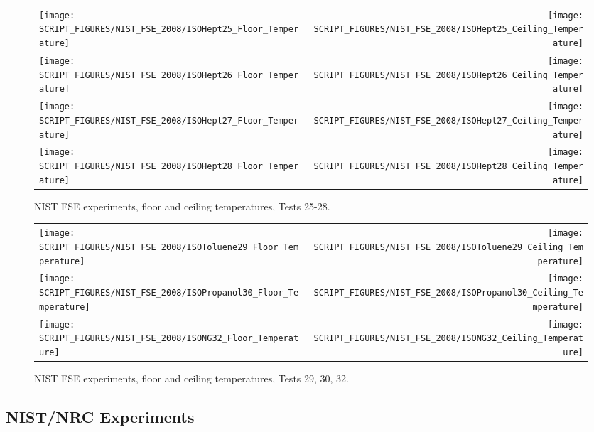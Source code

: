 \begin{figure}[p]
\begin{tabular*}{\textwidth}{l@{\extracolsep{\fill}}r}
\texttt{[image: SCRIPT\_FIGURES/NIST\_FSE\_2008/ISOHept25\_Floor\_Temperature]} &
\texttt{[image: SCRIPT\_FIGURES/NIST\_FSE\_2008/ISOHept25\_Ceiling\_Temperature]} \\
\texttt{[image: SCRIPT\_FIGURES/NIST\_FSE\_2008/ISOHept26\_Floor\_Temperature]} &
\texttt{[image: SCRIPT\_FIGURES/NIST\_FSE\_2008/ISOHept26\_Ceiling\_Temperature]} \\
\texttt{[image: SCRIPT\_FIGURES/NIST\_FSE\_2008/ISOHept27\_Floor\_Temperature]} &
\texttt{[image: SCRIPT\_FIGURES/NIST\_FSE\_2008/ISOHept27\_Ceiling\_Temperature]} \\
\texttt{[image: SCRIPT\_FIGURES/NIST\_FSE\_2008/ISOHept28\_Floor\_Temperature]} &
\texttt{[image: SCRIPT\_FIGURES/NIST\_FSE\_2008/ISOHept28\_Ceiling\_Temperature]}
\end{tabular*}
\caption[NIST FSE experiments, floor and ceiling temperatures, Tests 25-28]{NIST FSE experiments, floor and ceiling temperatures, Tests 25-28.}
\label{NIST_FSE_2008_Surface_Temp_6}
\end{figure}

\begin{figure}[p]
\begin{tabular*}{\textwidth}{l@{\extracolsep{\fill}}r}
\texttt{[image: SCRIPT\_FIGURES/NIST\_FSE\_2008/ISOToluene29\_Floor\_Temperature]} &
\texttt{[image: SCRIPT\_FIGURES/NIST\_FSE\_2008/ISOToluene29\_Ceiling\_Temperature]} \\
\texttt{[image: SCRIPT\_FIGURES/NIST\_FSE\_2008/ISOPropanol30\_Floor\_Temperature]} &
\texttt{[image: SCRIPT\_FIGURES/NIST\_FSE\_2008/ISOPropanol30\_Ceiling\_Temperature]} \\
\texttt{[image: SCRIPT\_FIGURES/NIST\_FSE\_2008/ISONG32\_Floor\_Temperature]} &
\texttt{[image: SCRIPT\_FIGURES/NIST\_FSE\_2008/ISONG32\_Ceiling\_Temperature]}
\end{tabular*}
\caption[NIST FSE experiments, floor and ceiling temperatures, Tests 29, 30, 32]{NIST FSE experiments, floor and ceiling temperatures, Tests 29, 30, 32.}
\label{NIST_FSE_2008_Surface_Temp_7}
\end{figure}

\clearpage

\subsection{NIST/NRC Experiments}

